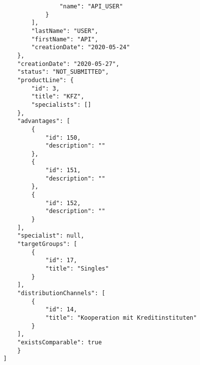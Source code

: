 \begin{itemize}
\begin{verbatim}
                    "name": "API_USER"
                }
            ],
            "lastName": "USER",
            "firstName": "API",
            "creationDate": "2020-05-24"
        },
        "creationDate": "2020-05-27",
        "status": "NOT_SUBMITTED",
        "productLine": {
            "id": 3,
            "title": "KFZ",
            "specialists": []
        },
        "advantages": [
            {
                "id": 150,
                "description": ""
            },
            {
                "id": 151,
                "description": ""
            },
            {
                "id": 152,
                "description": ""
            }
        ],
        "specialist": null,
        "targetGroups": [
            {
                "id": 17,
                "title": "Singles"
            }
        ],
        "distributionChannels": [
            {
                "id": 14,
                "title": "Kooperation mit Kreditinstituten"
            }
        ],
        "existsComparable": true
        }
    ]
    \end{verbatim}


\end{itemize}

%


